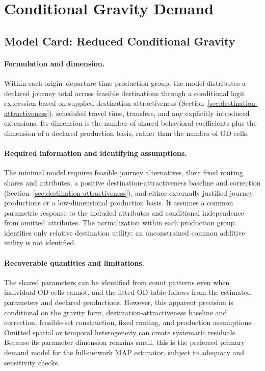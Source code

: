 
\section{Conditional Gravity Demand}
\subsection{Model Card: Reduced Conditional Gravity}

\paragraph{Formulation and dimension.}
Within each origin--departure-time production group, the model distributes a
declared journey total across feasible destinations through a conditional
logit expression based on supplied destination attractiveness
(Section~\ref{sec:destination-attractiveness}), scheduled travel time, transfers,
and any explicitly introduced extensions.  Its dimension is the number of
shared behavioral coefficients plus the dimension of a declared production
basis, rather than the number of OD cells.

\paragraph{Required information and identifying assumptions.}
The minimal model requires feasible journey alternatives, their fixed routing
shares and attributes, a positive destination-attractiveness baseline and
correction (Section~\ref{sec:destination-attractiveness}), and either
externally justified journey productions or a low-dimensional production
basis.  It assumes a common parametric response to the included attributes and
conditional independence from omitted attributes.  The normalization within
each production group identifies only relative destination utility; an
unconstrained common additive utility is not identified.

\paragraph{Recoverable quantities and limitations.}
The shared parameters can be identified from count patterns even when
individual OD cells cannot, and the fitted OD table follows from the estimated
parameters and declared productions.  However, this apparent precision is
conditional on the gravity form, destination-attractiveness baseline and
correction, feasible-set
construction, fixed routing, and production assumptions.  Omitted spatial or
temporal heterogeneity can create systematic residuals.  Because its parameter
dimension remains small, this is the preferred primary demand model for the
full-network MAP estimator, subject to adequacy and sensitivity checks.


